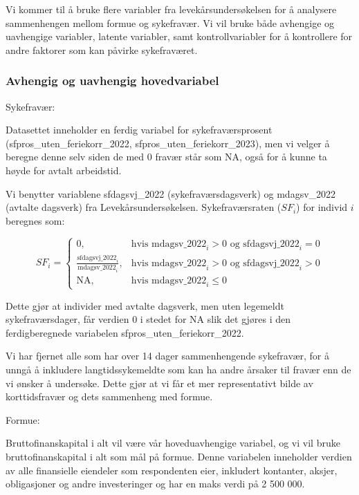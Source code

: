 \documentclass[
  12pt,
  a4paper,
  DIV=11,
  numbers=noendperiod]{scrartcl}
\begin{document}
Vi kommer til å bruke flere variabler fra levekårsundersøkelsen for å
analysere sammenhengen mellom formue og sykefravær. Vi vil bruke både
avhengige og uavhengige variabler, latente variabler, samt
kontrollvariabler for å kontrollere for andre faktorer som kan påvirke
sykefraværet.

\subsubsection{Avhengig og uavhengig
hovedvariabel}\label{avhengig-og-uavhengig-hovedvariabel}

Sykefravær:

Datasettet inneholder en ferdig variabel for sykefraværsprosent
(sfpros\_uten\_feriekorr\_2022, sfpros\_uten\_feriekorr\_2023), men vi
velger å beregne denne selv siden de med 0 fravær står som NA, også for
å kunne ta høyde for avtalt arbeidstid.

Vi benytter variablene sfdagsvj\_2022 (sykefraværsdagsverk) og
mdagsv\_2022 (avtalte dagsverk) fra Levekårsundersøkelsen.
Sykefraværsraten (\(SF_i\)) for individ \(i\) beregnes som:

\[
SF_i = 
\begin{cases}
0, & \text{hvis } \mathrm{mdagsv\_2022}_i > 0 \text{ og } \mathrm{sfdagsvj\_2022}_i = 0 \\
\frac{ \mathrm{sfdagsvj\_2022}_i }{ \mathrm{mdagsv\_2022}_i }, & \text{hvis } \mathrm{mdagsv\_2022}_i > 0 \text{ og } \mathrm{sfdagsvj\_2022}_i > 0 \\
\text{NA}, & \text{hvis } \mathrm{mdagsv\_2022}_i \leq 0
\end{cases}
\]

Dette gjør at individer med avtalte dagsverk, men uten legemeldt
sykefraværsdager, får verdien 0 i stedet for NA slik det gjøres i den
ferdigberegnede variabelen sfpros\_uten\_feriekorr\_2022.

Vi har fjernet alle som har over 14 dager sammenhengende sykefravær, for
å unngå å inkludere langtidssykemeldte som kan ha andre årsaker til
fravær enn de vi ønsker å undersøke. Dette gjør at vi får et mer
representativt bilde av korttidsfravær og dets sammenheng med formue.

Formue:

Bruttofinanskapital i alt vil være vår hoveduavhengige variabel, og vi
vil bruke bruttofinanskapital i alt som mål på formue. Denne variabelen
inneholder verdien av alle finansielle eiendeler som respondenten eier,
inkludert kontanter, aksjer, obligasjoner og andre investeringer og har
en maks verdi på 2 500 000.
\end{document}
